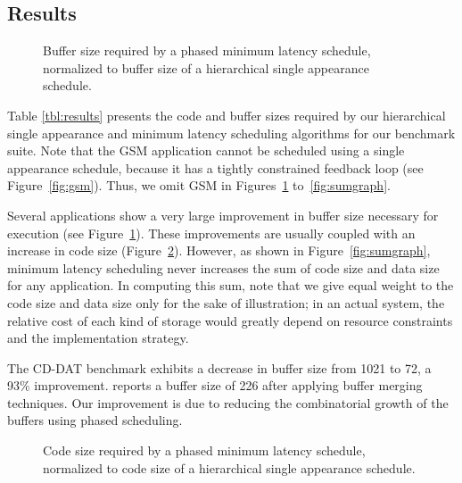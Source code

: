 \documentclass{sig-alt-full}
\begin{document}
\subsection{Results}
\label{sec:results:results}

\begin{figure}[t]
\vspace{6pt}
\caption{\small Buffer size required by a phased minimum latency schedule,
normalized to buffer size of a hierarchical single appearance
schedule.\protect\label{fig:buffergraph}}
\vspace{-6pt}
\end{figure}

Table \ref{tbl:results} presents the code and buffer sizes required by
our hierarchical single appearance and minimum latency scheduling
algorithms for our benchmark suite.  Note that the GSM application
cannot be scheduled using a single appearance schedule, because it has
a tightly constrained feedback loop (see Figure~\ref{fig:gsm}).  Thus,
we omit GSM in Figures~\ref{fig:buffergraph} to~\ref{fig:sumgraph}.

Several applications show a very large improvement in buffer size
necessary for execution (see Figure~\ref{fig:buffergraph}).  These
improvements are usually coupled with an increase in code size
(Figure~\ref{fig:codegraph}).  However, as shown in
Figure~\ref{fig:sumgraph}, minimum latency scheduling never increases
the sum of code size and data size for any application.  In computing
this sum, note that we give equal weight to the code size and data
size only for the sake of illustration; in an actual system, the
relative cost of each kind of storage would greatly depend on resource
constraints and the implementation strategy.

The CD-DAT benchmark exhibits a decrease in buffer size from 1021 to
72, a 93\% improvement. \cite{murt2000x2} reports a buffer size of 226
after applying buffer merging techniques. Our improvement is due to
reducing the combinatorial growth of the buffers using phased
scheduling.

\begin{figure}[t]
\vspace{6pt}
\centering
{}
\caption{\small Code size required by a phased minimum latency schedule,
normalized to code size of a hierarchical single appearance
schedule.\protect\label{fig:codegraph}}
\end{figure}
\end{document}
